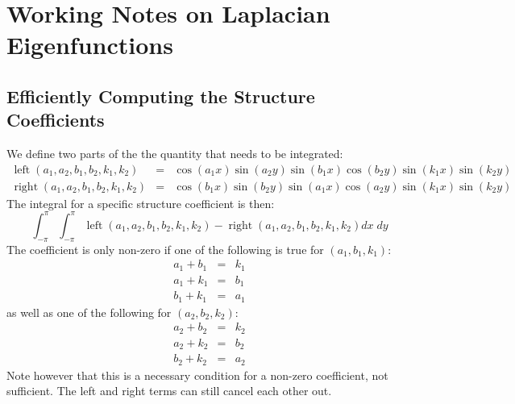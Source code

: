 \documentclass[12pt,onecolumn]{article}
\DeclareMathOperator{\Left}{left}
\DeclareMathOperator{\Right}{right}
\begin{document}
\vspace*{1em}
\section{Working Notes on Laplacian Eigenfunctions}
\subsection{Efficiently Computing the Structure Coefficients}

We define two parts of the the quantity that needs to be integrated:
\begin{eqnarray*}
\Left(a_1, a_2, b_1, b_2, k_1, k_2) &=& \cos(a_1 x) \sin(a_2 y) \sin(b_1 x) \cos(b_2 y) \sin(k_1 x) \sin(k_2 y)\\
\Right(a_1, a_2, b_1, b_2, k_1, k_2) &=& \cos(b_1 x) \sin(b_2 y) \sin(a_1 x) \cos(a_2 y) \sin(k_1 x) \sin(k_2 y)
\end{eqnarray*}
The integral for a specific structure coefficient is then:
\begin{equation}
\int_{-\pi}^\pi\int_{-\pi}^\pi \Left(a_1, a_2, b_1, b_2, k_1, k_2) - \Right(a_1, a_2, b_1, b_2, k_1, k_2) dx \; dy
\end{equation}
The coefficient is only non-zero if one of the following is true for $(a_1, b_1, k_1)$:
\begin{eqnarray*}
a_1 + b_1 &=& k_1 \\
a_1 + k_1 &=& b_1 \\
b_1 + k_1 &=& a _1
\end{eqnarray*}
as well as one of the following for $(a_2, b_2, k_2)$:
\begin{eqnarray*}
a_2 + b_2 &=& k_2 \\
a_2 + k_2 &=& b_2 \\
b_2 + k_2 &=& a _2
\end{eqnarray*}
Note however that this is a necessary condition for a non-zero coefficient, not sufficient. The left and right terms can still cancel each other out.
\end{document}
